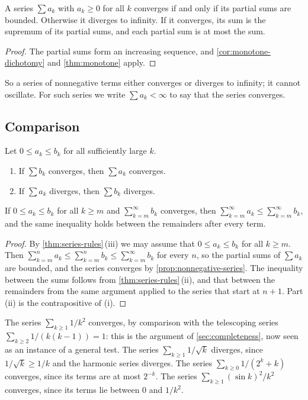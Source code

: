 \begin{proposition}
\label{prop:nonnegative-series}
A series $\sum a_k$ with $a_k\ge0$ for all $k$ converges if and only if its partial sums are bounded. Otherwise it diverges to infinity. If it converges, its sum is the supremum of its partial sums, and each partial sum is at most the sum.
\end{proposition}

\begin{proof}
The partial sums form an increasing sequence, and \cref{cor:monotone-dichotomy} and \cref{thm:monotone} apply.
\end{proof}

So a series of nonnegative terms either converges or diverges to infinity; it cannot oscillate. For such series we write $\sum a_k<\infty$ to say that the series converges.

\subsection{Comparison}

\begin{theorem}
\label{thm:comparison-series}
Let $0\le a_k\le b_k$ for all sufficiently large $k$.
\begin{enumerate}
\item If $\sum b_k$ converges, then $\sum a_k$ converges.
\item If $\sum a_k$ diverges, then $\sum b_k$ diverges.
\end{enumerate}
If $0\le a_k\le b_k$ for all $k\ge m$ and $\sum_{k=m}^\infty b_k$ converges, then $\sum_{k=m}^\infty a_k\le\sum_{k=m}^\infty b_k$, and the same inequality holds between the remainders after every term.
\end{theorem}

\begin{proof}
By \cref{thm:series-rules}\,(iii) we may assume that $0\le a_k\le b_k$ for all $k\ge m$. Then $\sum_{k=m}^na_k\le\sum_{k=m}^nb_k\le\sum_{k=m}^\infty b_k$ for every $n$, so the partial sums of $\sum a_k$ are bounded, and the series converges by \cref{prop:nonnegative-series}. The inequality between the sums follows from \cref{thm:series-rules}\,(ii), and that between the remainders from the same argument applied to the series that start at $n+1$. Part (ii) is the contrapositive of (i).
\end{proof}

The series $\sum_{k\ge1}1/k^2$ converges, by comparison with the telescoping series $\sum_{k\ge2}1/(k(k-1))=1$: this is the argument of \cref{sec:completeness}, now seen as an instance of a general test. The series $\sum_{k\ge1}1/\sqrt k$ diverges, since $1/\sqrt k\ge1/k$ and the harmonic series diverges. The series $\sum_{k\ge0}1/(2^k+k)$ converges, since its terms are at most $2^{-k}$. The series $\sum_{k\ge1}(\sin k)^2/k^2$ converges, since its terms lie between $0$ and $1/k^2$.

